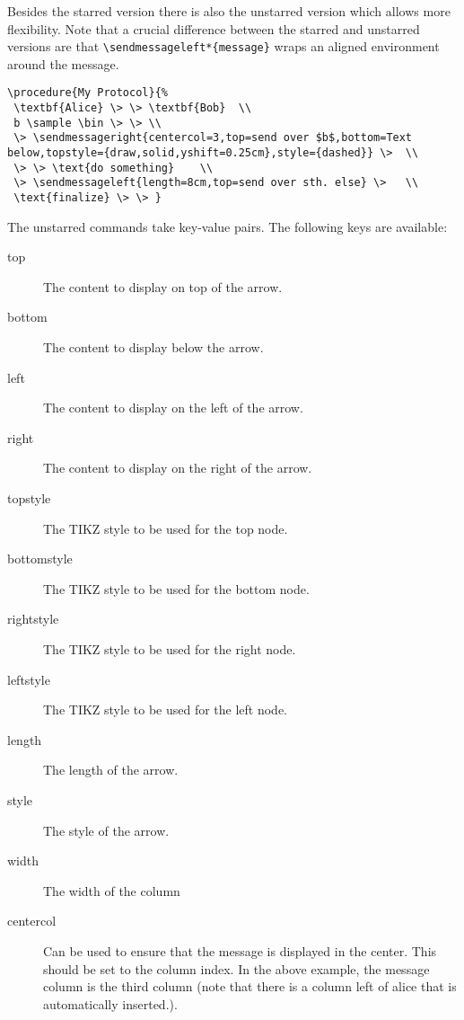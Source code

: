 \documentclass[a4paper]{report}
\begin{document}
Besides the starred version there is also the unstarred version which allows more flexibility. Note that a crucial difference between
the starred and unstarred versions are that  \lstinline$\sendmessageleft*{message}$ wraps an aligned environment around the message.
\begin{center}
\end{center}
\begin{lstlisting}
\procedure{My Protocol}{%
 \textbf{Alice} \> \> \textbf{Bob}  \\
 b \sample \bin \> \> \\
 \> \sendmessageright{centercol=3,top=send over $b$,bottom=Text below,topstyle={draw,solid,yshift=0.25cm},style={dashed}} \>  \\
 \> \> \text{do something}    \\
 \> \sendmessageleft{length=8cm,top=send over sth. else} \>   \\
 \text{finalize} \> \> }
\end{lstlisting}
The unstarred commands take key-value pairs. The following keys are available:
\begin{description}
\item[top]
The content to display on top of the arrow. 
\item[bottom]
The content to display below the arrow.
\item[left]
The content to display on the left of the arrow.
\item[right]
The content to display on the right of the arrow.
\item[topstyle]
The TIKZ style to be used for the top node.
\item[bottomstyle]
The TIKZ style to be used for the bottom node.
\item[rightstyle]
The TIKZ style to be used for the right node.
\item[leftstyle]
The TIKZ style to be used for the left node.
\item[length]
The length of the arrow.
\item[style]
The style of the arrow.
\item[width]
The width of the column
\item[centercol]
Can be used to ensure that the message is displayed in the center. This should be set to the
column index. In the above example, the message column is the third column (note that there is
a column left of alice that  is automatically inserted.).
\end{description}
\end{document}
